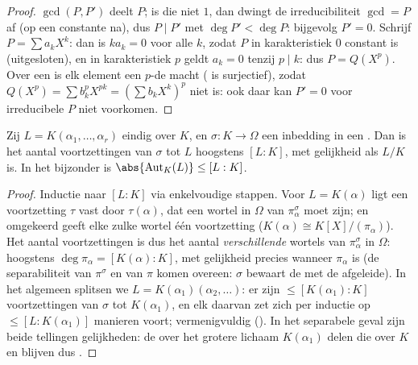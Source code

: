 \begin{proof}
$\gcd(P, P')$ deelt $P$; is die niet $1$, dan dwingt de
irreducibiliteit $\gcd = P$ af (op een constante na), dus $P \mid
P'$ met $\deg P' < \deg P$: bijgevolg $P' = 0$. Schrijf $P = \sum
a_kX^k$: dan is $ka_k = 0$ voor alle $k$, zodat $P$ in
karakteristiek $0$ constant is (uitgesloten), en in karakteristiek
$p$ geldt $a_k = 0$ tenzij $p \mid k$: dus $P = Q(X^p)$. Over een
 is elk element een $p$-de macht ( is
surjectief), zodat $Q(X^p) = \sum b_k^p X^{pk} = (\sum b_kX^k)^p$
niet  is: ook daar kan $P' = 0$ voor irreducibele $P$
niet voorkomen.
\end{proof}

\begin{proposition}\label{prop:b3:galois:embeddings}
Zij $L = K(\alpha_1, \dots, \alpha_r)$ eindig over $K$, en $\sigma
\colon K \to \Omega$ een inbedding in een . Dan is het aantal voortzettingen van $\sigma$ tot $L$
hoogstens $[L:K]$, met gelijkheid als $L/K$  is. In het
bijzonder is $\abs{\operatorname{Aut}_K(L)} \leq [L:K]$.
\end{proposition}

\begin{proof}
Inductie naar $[L:K]$ via enkelvoudige stappen. Voor $L =
K(\alpha)$ ligt een voortzetting $\tau$ vast door $\tau(\alpha)$,
dat een wortel in $\Omega$ van $\pi_\alpha^\sigma$ moet zijn; en
omgekeerd geeft elke zulke wortel één voortzetting ($K(\alpha)
\cong K[X]/(\pi_\alpha)$). Het aantal voortzettingen is dus het
aantal \emph{verschillende} wortels van $\pi_\alpha^\sigma$ in
$\Omega$: hoogstens $\deg\pi_\alpha = [K(\alpha):K]$, met
gelijkheid precies wanneer $\pi_\alpha$  is (de
separabiliteit van $\pi^\sigma$ en van $\pi$ komen overeen: $\sigma$
bewaart de  met de afgeleide). In het
algemeen splitsen we $L = K(\alpha_1)(\alpha_2, \dots)$: er zijn
$\leq [K(\alpha_1):K]$ voortzettingen van $\sigma$ tot
$K(\alpha_1)$, en elk daarvan zet zich per inductie op $\leq [L :
K(\alpha_1)]$ manieren voort; vermenigvuldig (). In het
separabele geval zijn beide tellingen gelijkheden: de
 over het grotere lichaam $K(\alpha_1)$ delen
die over $K$ en blijven dus .
\end{proof}

